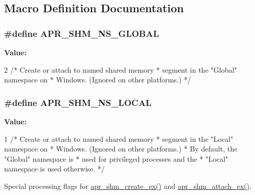 \subsection{Macro Definition Documentation}
\hypertarget{group__apr__shm_ga0de8e4acab42e7ff8e35e5ac9620f667}{
\subsubsection[{A\-P\-R\-\_\-\-S\-H\-M\-\_\-\-N\-S\-\_\-\-G\-L\-O\-B\-A\-L}]{\setlength{\rightskip}{0pt plus 5cm}\#define A\-P\-R\-\_\-\-S\-H\-M\-\_\-\-N\-S\-\_\-\-G\-L\-O\-B\-A\-L}}\label{group__apr__shm_ga0de8e4acab42e7ff8e35e5ac9620f667}
{\bfseries Value\-:}
\begin{DoxyCode}
2 \textcolor{comment}{/* Create or attach to named shared memory}
\textcolor{comment}{                               * segment in the "Global" namespace on}
\textcolor{comment}{                               * Windows.  (Ignored on other platforms.)}
\textcolor{comment}{                               */}
\end{DoxyCode}
\hypertarget{group__apr__shm_ga47cc28ddc5f32cf904383b9e4f82825b}{
\subsubsection[{A\-P\-R\-\_\-\-S\-H\-M\-\_\-\-N\-S\-\_\-\-L\-O\-C\-A\-L}]{\setlength{\rightskip}{0pt plus 5cm}\#define A\-P\-R\-\_\-\-S\-H\-M\-\_\-\-N\-S\-\_\-\-L\-O\-C\-A\-L}}\label{group__apr__shm_ga47cc28ddc5f32cf904383b9e4f82825b}
{\bfseries Value\-:}
\begin{DoxyCode}
1 \textcolor{comment}{/* Create or attach to named shared memory}
\textcolor{comment}{                               * segment in the "Local" namespace on}
\textcolor{comment}{                               * Windows.  (Ignored on other platforms.)}
\textcolor{comment}{                               * By default, the "Global" namespace is}
\textcolor{comment}{                               * used for privileged processes and the}
\textcolor{comment}{                               * "Local" namespace is used otherwise.}
\textcolor{comment}{                               */}
\end{DoxyCode}
Special processing flags for \hyperlink{group__apr__shm_ga21baaa66956641e06e072501f61882e7}{apr\-\_\-shm\-\_\-create\-\_\-ex()} and \hyperlink{group__apr__shm_ga088260723c96815610ff628f358d3630}{apr\-\_\-shm\-\_\-attach\-\_\-ex()}. 

